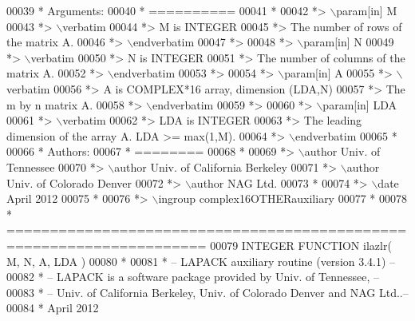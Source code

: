 \begin{DoxyCode}
00039 \textcolor{comment}{*  Arguments:}
00040 \textcolor{comment}{*  ==========}
00041 \textcolor{comment}{*}
00042 \textcolor{comment}{*> \(\backslash\)param[in] M}
00043 \textcolor{comment}{*> \(\backslash\)verbatim}
00044 \textcolor{comment}{*>          M is INTEGER}
00045 \textcolor{comment}{*>          The number of rows of the matrix A.}
00046 \textcolor{comment}{*> \(\backslash\)endverbatim}
00047 \textcolor{comment}{*>}
00048 \textcolor{comment}{*> \(\backslash\)param[in] N}
00049 \textcolor{comment}{*> \(\backslash\)verbatim}
00050 \textcolor{comment}{*>          N is INTEGER}
00051 \textcolor{comment}{*>          The number of columns of the matrix A.}
00052 \textcolor{comment}{*> \(\backslash\)endverbatim}
00053 \textcolor{comment}{*>}
00054 \textcolor{comment}{*> \(\backslash\)param[in] A}
00055 \textcolor{comment}{*> \(\backslash\)verbatim}
00056 \textcolor{comment}{*>          A is COMPLEX*16 array, dimension (LDA,N)}
00057 \textcolor{comment}{*>          The m by n matrix A.}
00058 \textcolor{comment}{*> \(\backslash\)endverbatim}
00059 \textcolor{comment}{*>}
00060 \textcolor{comment}{*> \(\backslash\)param[in] LDA}
00061 \textcolor{comment}{*> \(\backslash\)verbatim}
00062 \textcolor{comment}{*>          LDA is INTEGER}
00063 \textcolor{comment}{*>          The leading dimension of the array A. LDA >= max(1,M).}
00064 \textcolor{comment}{*> \(\backslash\)endverbatim}
00065 \textcolor{comment}{*}
00066 \textcolor{comment}{*  Authors:}
00067 \textcolor{comment}{*  ========}
00068 \textcolor{comment}{*}
00069 \textcolor{comment}{*> \(\backslash\)author Univ. of Tennessee }
00070 \textcolor{comment}{*> \(\backslash\)author Univ. of California Berkeley }
00071 \textcolor{comment}{*> \(\backslash\)author Univ. of Colorado Denver }
00072 \textcolor{comment}{*> \(\backslash\)author NAG Ltd. }
00073 \textcolor{comment}{*}
00074 \textcolor{comment}{*> \(\backslash\)date April 2012}
00075 \textcolor{comment}{*}
00076 \textcolor{comment}{*> \(\backslash\)ingroup complex16OTHERauxiliary}
00077 \textcolor{comment}{*}
00078 \textcolor{comment}{*  =====================================================================}
00079 \textcolor{keyword}{      INTEGER }\textcolor{keyword}{FUNCTION }ilazlr( M, N, A, LDA )
00080 \textcolor{comment}{*}
00081 \textcolor{comment}{*  -- LAPACK auxiliary routine (version 3.4.1) --}
00082 \textcolor{comment}{*  -- LAPACK is a software package provided by Univ. of Tennessee,    --}
00083 \textcolor{comment}{*  -- Univ. of California Berkeley, Univ. of Colorado Denver and NAG Ltd..--}
00084 \textcolor{comment}{*     April 2012}

\end{DoxyCode}
